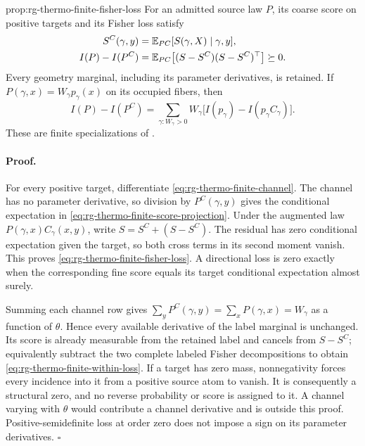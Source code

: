 {prop:rg-thermo-finite-fisher-loss}
For an admitted source law $P$, its coarse score on positive targets and
its Fisher loss satisfy
\begin{align}
 S^C(\gamma,y)
 &=\mathbb E_{P C}[S(\gamma,X)\mid\gamma,y],
 \label{eq:rg-thermo-finite-score-projection}\\
 I(P)-I(P^C)
 &=\mathbb E_{P C}\bigl[(S-S^C)(S-S^C)^\top\bigr]\succeq0.
 \label{eq:rg-thermo-finite-fisher-loss}
\end{align}
Every geometry marginal, including its parameter derivatives, is retained.
If $P(\gamma,x)=W_\gamma p_\gamma(x)$ on its occupied fibers, then
\begin{equation}
 I(P)-I(P^C)=\sum_{\gamma:W_\gamma>0}W_\gamma
                  \bigl[I(p_\gamma)-I(p_\gamma C_\gamma)\bigr].
 \label{eq:rg-thermo-finite-within-loss}
\end{equation}
These are finite specializations of
.\thermoestablishedstatus


\paragraph{Proof.}
For every positive target, differentiate
\cref{eq:rg-thermo-finite-channel}. The channel has no parameter
derivative, so division by $P^C(\gamma,y)$ gives the conditional
expectation in \cref{eq:rg-thermo-finite-score-projection}.
Under the augmented law $P(\gamma,x)C_\gamma(x,y)$, write
$S=S^C+(S-S^C)$. The residual has zero conditional expectation given the
target, so both cross terms in its second moment vanish. This proves
\cref{eq:rg-thermo-finite-fisher-loss}. A directional loss is zero exactly
when the corresponding fine score equals its target conditional
expectation almost surely.

Summing each channel row gives
$\sum_yP^C(\gamma,y)=\sum_xP(\gamma,x)=W_\gamma$ as a function of
$\theta$. Hence every available derivative of the label marginal is
unchanged. Its score is already measurable from the retained label and
cancels from $S-S^C$; equivalently subtract the two complete labeled Fisher
decompositions to obtain \cref{eq:rg-thermo-finite-within-loss}.
If a target has zero mass, nonnegativity forces every incidence into it
from a positive source atom to vanish. It is consequently a structural
zero, and no reverse probability or score is assigned to it. A channel
varying with $\theta$ would contribute a channel derivative and is outside
this proof. Positive-semidefinite loss at order zero does not impose a
sign on its parameter derivatives. $\square$


